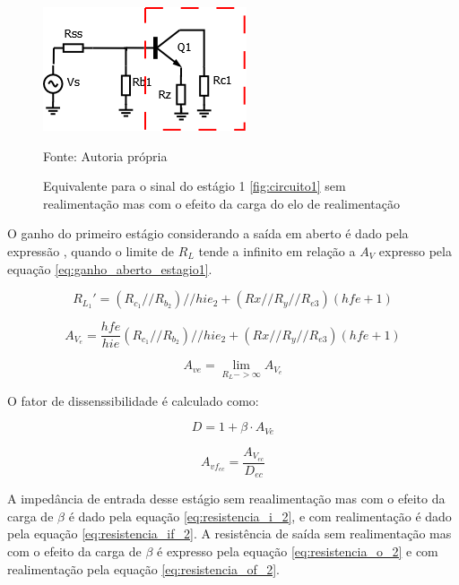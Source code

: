 \documentclass[openright]{normas-utf-tex} %
\begin{document}
\begin{figure}[H]
\centering
\includegraphics[width=0.75\linewidth]{img/SinalEstagio1.png}
\caption{Equivalente para o sinal do estágio 1 \ref{fig:circuito1} sem realimentação mas com o efeito da carga do elo de realimentação}
Fonte: Autoria própria
\label{fig:sinal_estagio1}
\end{figure}


O ganho do primeiro estágio considerando a saída em aberto é dado pela expressão , quando o limite de $R_L$ tende a infinito em relação a $A_V$ expresso pela equação \ref{eq:ganho_aberto_estagio1}.



\begin{equation}\label{eq:carga_st1}
R_{L_1}'=\left(R_{c_1}//R_{b_2}\right)//hie_2+\left(Rx//R_y//R_{e3}\right)\left(hfe+1\right) 
\end{equation}

\begin{equation}\label{eq:Av_emissor_comum}
A_{V_{e}}= \frac{hfe}{hie} \left(R_{c_1}//R_{b_2}\right)//hie_2+\left(Rx//R_y//R_{e3}\right)\left(hfe+1\right) 
\end{equation}


\begin{equation} \label{eq:ganho_aberto_estagio1}
A_{ve}= \lim_{R_L->\infty} A_{V_{e}}
\end{equation}

O fator de dissenssibilidade é calculado como:

\begin{equation}
D= 1+ \beta \cdot A_{Ve}
\end{equation}

\begin{equation}
A_{vf_{ec}} = \frac{A_{V_{ec}}}{D_{ec}}  
\end{equation}

A impedância de entrada desse estágio sem reaalimentação mas com o efeito da carga de $\beta$ é dado pela equação \ref{eq:resistencia_i_2}, e com realimentação é dado pela equação \ref{eq:resistencia_if_2}. A resistência de saída sem realimentação mas com o efeito da carga de $\beta$ é expresso pela equação \ref{eq:resistencia_o_2} e com realimentação pela equação \ref{eq:resistencia_of_2}.
\end{document}
